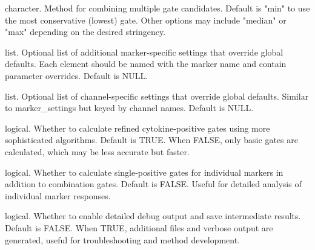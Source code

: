 \documentclass[letterpaper]{book}
\begin{document}
\begin{Arguments}
\begin{ldescription}
\item[\code{gate\_combn}] character. Method for combining multiple gate candidates.
Default is "min" to use the most conservative (lowest) gate. Other options may
include "median" or "max" depending on the desired stringency.

\item[\code{marker\_settings}] list. Optional list of additional marker-specific settings
that override global defaults. Each element should be named with the marker name
and contain parameter overrides. Default is NULL.

\item[\code{chnl\_settings}] list. Optional list of channel-specific settings that override
global defaults. Similar to marker\_settings but keyed by channel names.
Default is NULL.

\item[\code{calc\_cyt\_pos\_gates}] logical. Whether to calculate refined cytokine-positive
gates using more sophisticated algorithms. Default is TRUE. When FALSE, only
basic gates are calculated, which may be less accurate but faster.

\item[\code{calc\_single\_pos\_gates}] logical. Whether to calculate single-positive gates
for individual markers in addition to combination gates. Default is FALSE.
Useful for detailed analysis of individual marker responses.

\item[\code{debug}] logical. Whether to enable detailed debug output and save intermediate
results. Default is FALSE. When TRUE, additional files and verbose output are
generated, useful for troubleshooting and method development.
\end{ldescription}
\end{Arguments}
%
\end{document}
